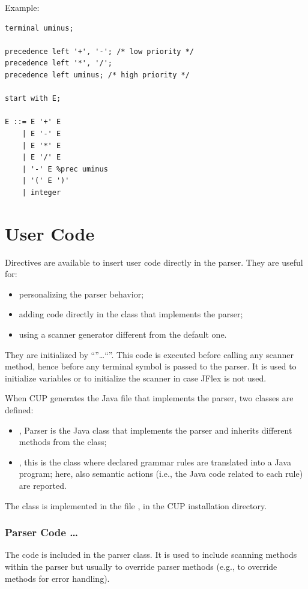 Example:
\begin{lstlisting}[frame=single]
terminal uminus;

precedence left '+', '-'; /* low priority */
precedence left '*', '/';
precedence left uminus; /* high priority */

start with E;

E ::= E '+' E
    | E '-' E
    | E '*' E
    | E '/' E
    | '-' E %prec uminus
    | '(' E ')'
    | integer
\end{lstlisting}

\section{User Code}
Directives are available to insert user code directly in the parser.
They are useful for:
\begin{itemize}
    \item
    personalizing the parser behavior;
    \item
    adding code directly in the class that implements the parser;
    \item
    using a scanner generator different from the default one.
\end{itemize}
They are initialized by ``\code{\{:}''\dots``\code{:\}}''.
This code is executed before calling any scanner method, hence before any terminal symbol is passed to the parser.
It is used to initialize variables or to initialize the scanner in case JFlex is not used.

When CUP generates the Java file that implements the parser, two classes are defined:
\begin{itemize}
    \item
    , Parser is the Java class that implements the parser and inherits different methods from the  class;
    \item
    , this is the class where declared grammar rules are translated into a Java program; here, also semantic actions (i.e., the Java code related to each rule) are reported.
\end{itemize}
The  class is implemented in the file , in the CUP installation directory.

\subsubsection{Parser Code \code{\{:}\ldots\code{:\}}}
The code is included in the parser class.
It is used to include scanning methods within the parser but usually to override parser methods (e.g., to override methods for error handling).


